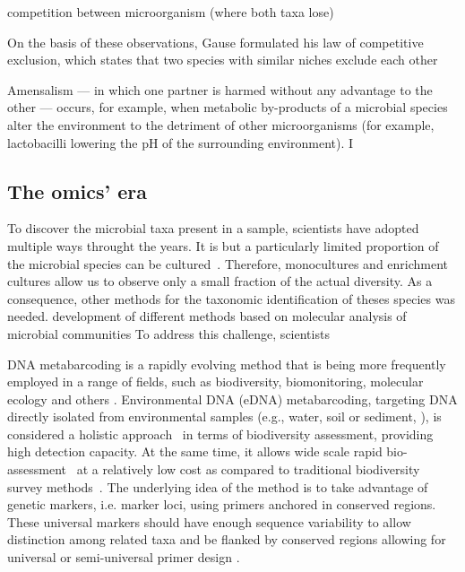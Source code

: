       competition between microorganism (where both taxa lose)

      On the basis of
      these observations, Gause formulated his law of competitive exclusion, which states that two species with
      similar niches exclude each other

      Amensalism — in which one partner is harmed without any advantage to the other — occurs, for example,
      when metabolic by-products of a microbial species
      alter the environment to the detriment of other microorganisms (for example, lactobacilli lowering the pH
      of the surrounding environment). I



      \subsection{The omics' era}

      To discover the microbial taxa present in a sample, scientists have 
      adopted multiple ways throught the years. 
      It is but a particularly limited proportion of the microbial species 
      can be cultured~\citeyear{steen2019high}.
      Therefore, monocultures and enrichment cultures allow us to observe 
      only a small fraction of the actual diversity. 
      As a consequence, other methods for the taxonomic identification of theses
      species was needed.
      development of different methods based
      on molecular analysis of microbial communities 
      To address this challenge, scientists 
   
   
      DNA metabarcoding is a rapidly evolving method that is being more frequently employed 
      in a range of fields, such as biodiversity, biomonitoring, molecular ecology and others 
      \citep{deiner2017environmental, ruppert2019past}. 
      Environmental DNA (eDNA) metabarcoding, targeting DNA directly isolated from environmental samples 
      (e.g., water, soil or sediment, \citep{taberlet2012environmental}), is considered a holistic 
      approach~\citep{stat2017ecosystem} in terms of biodiversity assessment, providing high detection capacity. 
      At the same time, it allows wide scale rapid bio-assessment~\citep{stat2017ecosystem} 
      at a relatively low cost as compared to traditional biodiversity survey methods~\citep{ji2013reliable}. 
      The underlying idea of the method is to take advantage of genetic markers, i.e. marker loci, using primers anchored in conserved regions. 
      These universal markers should have enough sequence variability to allow distinction among related taxa and be flanked by conserved regions allowing for universal or semi-universal primer design \citep{deagle2014dna}. 
      \fi
   
